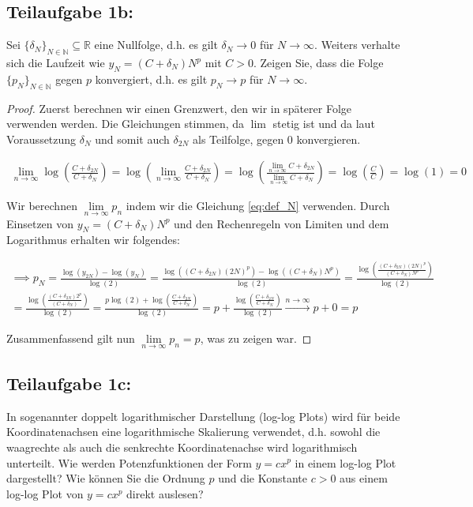 \documentclass[]{article}
\begin{document}
\subsection*{Teilaufgabe 1b:}
Sei $\{\delta_N\}_{N \in \mathbb{N}} \subseteq \mathbb{R}$ eine Nullfolge, d.h. es gilt $\delta_N \rightarrow 0$ für $N \rightarrow \infty$. Weiters verhalte sich die Laufzeit wie $y_N = (C+\delta_N)N^p$ mit $C > 0$. Zeigen Sie, dass die Folge $\{p_N\}_{N \in \mathbb{N}}$ gegen $p$ konvergiert, d.h. es gilt $p_N \rightarrow p$ für $N \rightarrow \infty$.

\begin{proof}	
	Zuerst berechnen wir einen Grenzwert, den wir in späterer Folge verwenden werden. Die Gleichungen stimmen, da $\lim$ stetig ist und da laut Voraussetzung $\delta_N$ und somit auch $\delta_{2N}$ als Teilfolge, gegen $0$ konvergieren.
	
	\begin{align}
		\lim\limits_{n\rightarrow\infty} \log\left(\frac{C+\delta_{2N}}{C+\delta_N}\right) = \log\left(\lim\limits_{n\rightarrow\infty}\frac{C+\delta_{2N}}{C+\delta_N}\right) = \log\left(\frac{\lim\limits_{n\rightarrow\infty}C+\delta_{2N}}{\lim\limits_{n\rightarrow\infty}C+\delta_N}\right) = \log\left(\frac{C}{C}\right) = \log(1) = 0
	\end{align}

	Wir berechnen $\lim\limits_{n\rightarrow\infty}p_n$ indem wir die Gleichung \ref{eq:def_N} verwenden. Durch Einsetzen von $y_N = (C+\delta_N)N^p$ und den Rechenregeln von Limiten und dem Logarithmus erhalten wir folgendes:

	\begin{align}
		\implies
		p_N = \frac{\log(y_{2N}) - \log(y_N)}{\log(2)} = \frac{\log((C+\delta_{2N})(2N)^p) - \log((C+\delta_N)N^p)}{\log(2)} = \frac{\log\left(\frac{(C+\delta_{2N})(2N)^p}{(C+\delta_N)N^p}\right)}{\log(2)} \\
		= \frac{\log\left(\frac{(C+\delta_{2N})2^p}{(C+\delta_N)}\right)}{\log(2)} = \frac{p \log(2) + \log\left(\frac{C+\delta_{2N}}{C+\delta_N}\right)}{\log(2)} = p + \frac{\log\left(\frac{C+\delta_{2N}}{C+\delta_N}\right)}{\log(2)} \xrightarrow{n\rightarrow\infty} p + 0 = p
	\end{align}
	
	Zusammenfassend gilt nun $\lim\limits_{n\rightarrow\infty}p_n = p$, was zu zeigen war.

\end{proof}


\subsection*{Teilaufgabe 1c:}
In sogenannter doppelt logarithmischer Darstellung (log-log Plots) wird für beide Koordinatenachsen eine logarithmische Skalierung verwendet, d.h. sowohl die waagrechte als auch die senkrechte Koordinatenachse wird logarithmisch unterteilt. Wie werden Potenzfunktionen der Form $y = c x^p$ in einem log-log Plot dargestellt? Wie können Sie die Ordnung $p$ und die Konstante $c > 0$ aus einem log-log Plot von $y = cx^p$ direkt auslesen?
\end{document}
